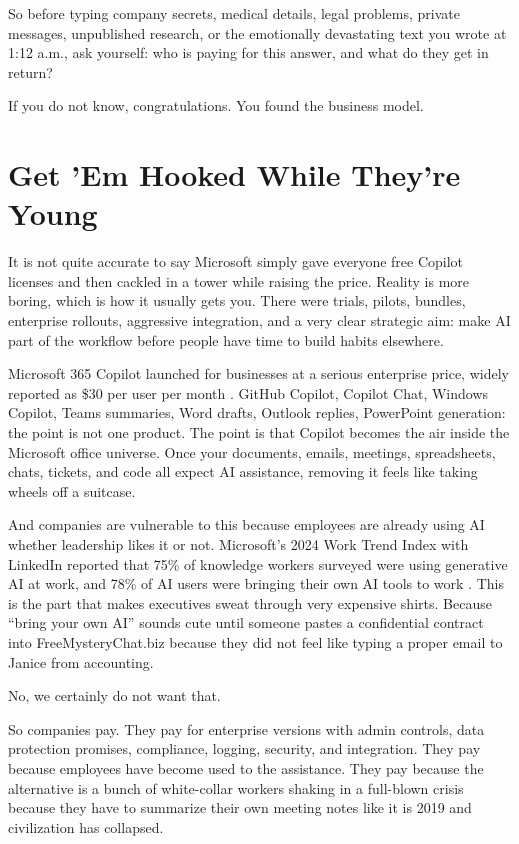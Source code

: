 \documentclass[12pt,oneside]{book}
\begin{document}
So before typing company secrets, medical details, legal problems, private messages, unpublished research, or the emotionally devastating text you wrote at 1:12 a.m., ask yourself: who is paying for this answer, and what do they get in return?

If you do not know, congratulations. You found the business model.

\chapter{Get 'Em Hooked While They're Young}

It is not quite accurate to say Microsoft simply gave everyone free Copilot licenses and then cackled in a tower while raising the price. Reality is more boring, which is how it usually gets you. There were trials, pilots, bundles, enterprise rollouts, aggressive integration, and a very clear strategic aim: make AI part of the workflow before people have time to build habits elsewhere.

Microsoft 365 Copilot launched for businesses at a serious enterprise price, widely reported as \$30 per user per month \parencite{microsoft365copilot2023}. GitHub Copilot, Copilot Chat, Windows Copilot, Teams summaries, Word drafts, Outlook replies, PowerPoint generation: the point is not one product. The point is that Copilot becomes the air inside the Microsoft office universe. Once your documents, emails, meetings, spreadsheets, chats, tickets, and code all expect AI assistance, removing it feels like taking wheels off a suitcase.

And companies are vulnerable to this because employees are already using AI whether leadership likes it or not. Microsoft's 2024 Work Trend Index with LinkedIn reported that 75\% of knowledge workers surveyed were using generative AI at work, and 78\% of AI users were bringing their own AI tools to work \parencite{microsoft2024worktrend}. This is the part that makes executives sweat through very expensive shirts. Because ``bring your own AI'' sounds cute until someone pastes a confidential contract into FreeMysteryChat.biz because they did not feel like typing a proper email to Janice from accounting.

No, we certainly do not want that.

So companies pay. They pay for enterprise versions with admin controls, data protection promises, compliance, logging, security, and integration. They pay because employees have become used to the assistance. They pay because the alternative is a bunch of white-collar workers shaking in a full-blown crisis because they have to summarize their own meeting notes like it is 2019 and civilization has collapsed.
\end{document}
